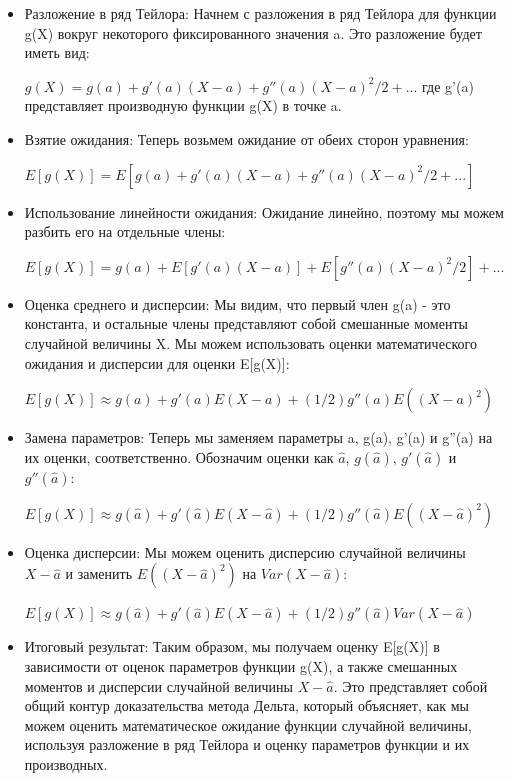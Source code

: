 \documentclass[specialist,
               substylefile = spbu_report.rtx,
               subf,href,colorlinks=true, 12pt]{disser}
\begin{document}
\begin{itemize}
    \item Разложение в ряд Тейлора: Начнем с разложения в ряд Тейлора для функции g(X) вокруг некоторого фиксированного значения a. Это разложение будет иметь вид:
    
    $g(X) = g(a) + g'(a)(X - a) + g''(a)(X - a)^2/2 + ...$
    где g'(a) представляет производную функции g(X) в точке a.
    \item Взятие ожидания: Теперь возьмем ожидание от обеих сторон уравнения:
    
    $E[g(X)] = E[g(a) + g'(a)(X - a) + g''(a)(X - a)^2/2 + ...]$
    \item Использование линейности ожидания: Ожидание линейно, поэтому мы можем разбить его на отдельные члены:
    
    $E[g(X)] = g(a) + E[g'(a)(X - a)] + E[g''(a)(X - a)^2/2] + ...$
    \item Оценка среднего и дисперсии: Мы видим, что первый член g(a) - это константа, и остальные члены представляют собой смешанные моменты случайной величины X. Мы можем использовать оценки математического ожидания и дисперсии для оценки E[g(X)]:
   
    $E[g(X)] \approx g(a) + g'(a)E(X - a) + (1/2)g''(a)E((X - a)^2)$
    \item Замена параметров: Теперь мы заменяем параметры a, g(a), g'(a) и g''(a) на их оценки, соответственно. Обозначим оценки как $\widehat{a}$, $g(\widehat{a})$, $g'(\widehat{a})$ и $g''(\widehat{a})$:
    
    $E[g(X)] \approx g(\widehat{a} ) + g'(\widehat{a})E(X - \widehat{a}) + (1/2)g''(\widehat{a})E((X - \widehat{a})^2)$
    \item Оценка дисперсии: Мы можем оценить дисперсию случайной величины $X - \widehat{a}$ и заменить $E((X - \widehat{a})^2)$ на $Var(X - \widehat{a})$:
    
    $E[g(X)] \approx g(\widehat{a}) + g'(\widehat{a})E(X - \widehat{a}) + (1/2)g''(\widehat{a})Var(X - \widehat{a})$
    \item Итоговый результат: Таким образом, мы получаем оценку E[g(X)] в зависимости от оценок параметров функции g(X), а также смешанных моментов и дисперсии случайной величины $X - \widehat{a}$.
    Это представляет собой общий контур доказательства метода Дельта, который объясняет, как мы можем оценить математическое ожидание функции случайной величины, используя разложение в ряд Тейлора и оценку параметров функции и их производных.
\end{itemize}
\end{document}

